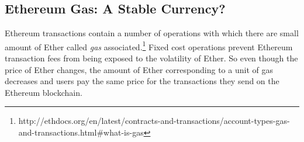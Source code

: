 
\subsection{Ethereum Gas: A Stable Currency?}\label{sec:GasInvs}

Ethereum transactions contain a number of operations with which there are small amount of Ether called \textit{gas} associated.\footnote{http://ethdocs.org/en/latest/contracts-and-transactions/account-types-gas-and-transactions.html\#what-is-gas} Fixed cost operations prevent Ethereum transaction fees from being exposed to the volatility of Ether. So even though the price of Ether changes, the amount of Ether corresponding to a unit of gas decreases and users pay the same price for the transactions they send on the Ethereum blockchain. \par

